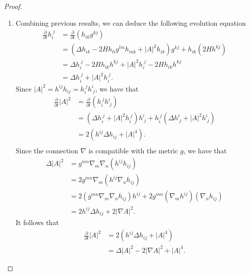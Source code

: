 \begin{proof}
\begin{enumerate}[\normalfont(1)]
		\item Combining previous results, we can deduce the following evolution equation \begin{equation*}
			      \begin{split}
				      \frac{\partial }{\partial t} h_{i}^{\ j}
				      &= \frac{\partial }{\partial t} (h_{ik}^{} g_{}^{kj} )\\
				      &= (\Delta h_{ik}^{} - 2 H h_{li }^{} g_{}^{lm } h_{mk}^{} + \left| A \right| ^2 h_{ik}^{})g_{}^{kj}+ h_{ik}^{} (2H h_{}^{kj} )\\
				      &= \Delta h_{i}^{\ j} - 2H h_{ik}^{} h_{}^{kj} + \left| A \right| ^2 h_{i}^{\ j} - 2H h_{ik}^{} h_{}^{kj}\\
				      &= \Delta h_{i}^{\ j} + \left| A \right| ^2 h_{i}^{\ j}.
			      \end{split}
		      \end{equation*}
		      Since $\left| A \right| ^2=h_{}^{ij} h_{ij}^{} = h_{i}^{\ j} h_{\ j}^{i}$, we have that
		      \begin{equation*}
			      \begin{split}
				      \frac{\partial }{\partial t} \left| A \right| ^2
				      &= \frac{\partial }{\partial t}  (h_{i}^{\ j} h_{\ j}^{i}) \\
				      &= (\Delta h_{i}^{\ j} + \left| A \right| ^2 h_{i}^{\ j})h_{\ j}^{i} + h_{i}^{\ j}(\Delta h_{\ j}^{i} + \left| A \right| ^2 h_{\ j}^{i})\\
				      &= 2(h_{}^{ij} \Delta h_{ij}^{} + \left| A \right| ^4).\\
			      \end{split}
		      \end{equation*}
		      Since the connection $\nabla $ is compatible with the metric $g$, we have that
		      \begin{equation*}
			      \begin{split}
				      \Delta \left| A \right| ^2
				      &= g_{}^{mn } \nabla_{m}\nabla_{n} (h_{}^{ij} h_{ij}^{})  \\
				      &= 2g_{}^{mn } \nabla_{m} (h_{}^{ij} \nabla_{n}h_{ij}^{})  \\
				      &= 2(g_{}^{mn } \nabla_{m}\nabla_{n}h_{ij}^{}) h_{}^{ij} + 2g_{}^{mn } (\nabla_{m} h_{}^{ij}) (\nabla_{n}h_{ij}^{}) \\
				      &= 2 h_{}^{ij} \Delta h_{ij}^{} + 2 \left| \nabla A \right| ^2.
			      \end{split}
		      \end{equation*}
		      It follows that
		      \begin{equation*}
			      \begin{split}
				      \frac{\partial }{\partial t} \left| A \right| ^2
				      &= 2(h_{}^{ij} \Delta h_{ij}^{} + \left| A \right| ^4)\\
				      &= \Delta \left| A \right| ^2 - 2 \left| \nabla A \right| ^2 + \left| A \right| ^4.
			      \end{split}
		      \end{equation*}
	\end{enumerate}
\end{proof}
